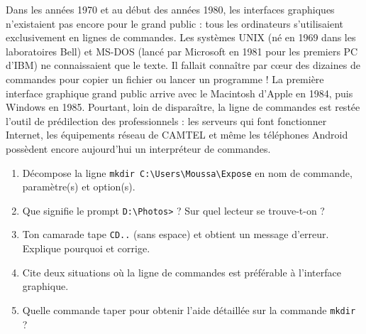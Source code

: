 \documentclass[11pt]{article}
\newcommand{\cle}[1]{{\popxbold\color{popdark}#1}}
\begin{document}
\begin{savaistu}
Dans les années 1970 et au début des années 1980, les interfaces graphiques n'existaient pas encore pour le grand public : tous les ordinateurs s'utilisaient exclusivement en lignes de commandes. Les systèmes \cle{UNIX} (né en 1969 dans les laboratoires Bell) et \cle{MS-DOS} (lancé par Microsoft en 1981 pour les premiers PC d'IBM) ne connaissaient que le texte. Il fallait connaître par cœur des dizaines de commandes pour copier un fichier ou lancer un programme ! La première interface graphique grand public arrive avec le Macintosh d'Apple en 1984, puis Windows en 1985. Pourtant, loin de disparaître, la ligne de commandes est restée l'outil de prédilection des professionnels : les serveurs qui font fonctionner Internet, les équipements réseau de CAMTEL et même les téléphones Android possèdent encore aujourd'hui un interpréteur de commandes.
\end{savaistu}

\begin{exercice}
\begin{enumerate}
\item Décompose la ligne \texttt{mkdir C:\textbackslash Users\textbackslash Moussa\textbackslash Expose} en nom de commande, paramètre(s) et option(s).
\item Que signifie le prompt \texttt{D:\textbackslash Photos>} ? Sur quel lecteur se trouve-t-on ?
\item Ton camarade tape \texttt{CD..} (sans espace) et obtient un message d'erreur. Explique pourquoi et corrige.
\item Cite deux situations où la ligne de commandes est préférable à l'interface graphique.
\item Quelle commande taper pour obtenir l'aide détaillée sur la commande \texttt{mkdir} ?
\end{enumerate}
\end{exercice}
\end{document}

